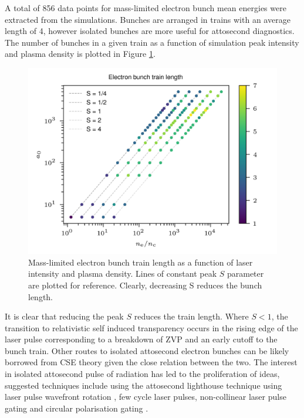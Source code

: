 A total of 856 data points for mass-limited electron bunch mean energies were extracted from the simulations. Bunches are arranged in trains with an average length of 4, however isolated bunches are more useful for attosecond diagnostics. The number of bunches in a given train as a function of simulation peak intensity and plasma density is plotted in Figure \ref{fig:zvpbunchtrainlength}.
\begin{figure}
	\centering
	\includegraphics[width=0.7\linewidth]{figures/zvp/zvp_bunch_train_length}
	\caption[Mass-limited electron bunch train length as a function of laser intensity and plasma density.]{Mass-limited electron bunch train length as a function of laser intensity and plasma density. Lines of constant peak $S$ parameter are plotted for reference. Clearly, decreasing S reduces the bunch length.}
	\label{fig:zvpbunchtrainlength}
\end{figure}
It is clear that reducing the peak $S$ reduces the train length. Where $S <1$, the transition to relativistic self induced transparency occurs in the rising edge of the laser pulse corresponding to a breakdown of ZVP and an early cutoff to the bunch train. Other routes to isolated attosecond electron bunches can be likely borrowed from CSE theory given the close relation between the two. The interest in isolated attosecond pulse of radiation has led to the proliferation of ideas, suggested techniques include using the attosecond lighthouse technique using laser pulse wavefront rotation \cite{vincentiAttosecondLighthousesHow2012}, few cycle laser pulses\cite{heisslerFewCycleDrivenRelativistically2012}, non-collinear laser pulse gating \cite{kennedyIsolatedUltrabrightAttosecond2022}  and circular polarisation gating \cite{yeungDependenceLaserDrivenCoherent2014}.

